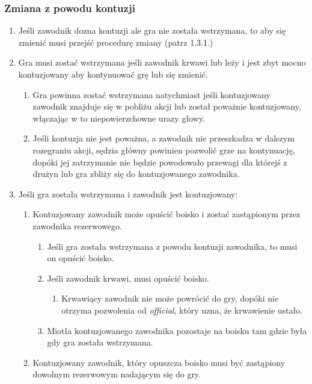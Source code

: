 \documentclass[11pt,a4paper]{article}
\begin{document}
\subsubsection{Zmiana z powodu kontuzji}
\begin{enumerate}
  \item Jeśli zawodnik dozna kontuzji ale gra nie została wstrzymana, to aby się zmienić musi przejść procedurę zmiany (patrz 1.3.1.) %
  \item Gra musi zostać wstrzymana jeśli zawodnik krwawi lub leży i jest zbyt mocno kontuzjowany aby kontynuować grę lub się zmienić.
  \begin{enumerate}
    \item Gra powinna zostać wstrzymana natychmiast jeśli kontuzjowany zawodnik znajduje się w pobliżu akcji lub został poważnie kontuzjowany, włączając w to niepowierzchowne urazy głowy.
    \item Jeśli kontuzja nie jest poważna, a zawodnik nie przeszkadza w dalszym rozegraniu akcji, sędzia główny powinien pozwolić grze na kontynuację, dopóki jej zatrzymanie nie będzie powodowało przewagi dla którejś z drużyn lub gra zbliży się do kontuzjowanego zawodnika.
  \end{enumerate}
  \item Jeśli gra została wstrzymana i zawodnik jest kontuzjowany:
  \begin{enumerate}
    \item Kontuzjowany zawodnik może opuścić boisko i zostać zastąpionym przez zawodnika rezerwowego.
    \begin{enumerate}
      \item Jeśli gra została wstrzymana z powodu kontuzji zawodnika, to musi on opuścić boisko.
      \item Jeśli zawodnik krwawi, musi opuścić boisko.
      \begin{enumerate}
        \item Krwawiący zawodnik nie może powrócić do gry, dopóki nie otrzyma pozwolenia od \emph{official}, który uzna, że krwawienie ustało.
      \end{enumerate}
      \item Miotła kontuzjowanego zawodnika pozostaje na boisku tam gdzie była gdy gra została wstrzymana.
    \end{enumerate}
    \item Kontuzjowany zawodnik, który opuszcza boisko musi być zastąpiony dowolnym rezerwowym nadającym się do gry.
    \begin{enumerate}

\end{enumerate}
\end{enumerate}
\end{enumerate}
\end{document}
